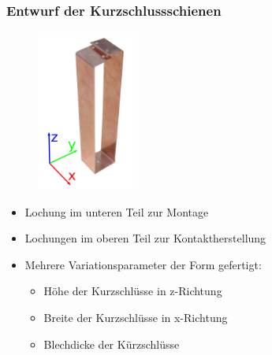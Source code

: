 \documentclass[accentcolor=tud9b, colorbacktitle, inverttitle]{tudbeamer}
\begin{document}
\begin{frame}\frametitle{Entwurf der Kurzschlussschienen}
\vspace{-1em}
\begin{multicols}{2}
	\begin{figure}[h]
		\centering
		\includegraphics[width=0.3\textwidth]{KS}
	\end{figure}
	\vfill\null
	\columnbreak
	\begin{itemize}
		\item Lochung im unteren Teil zur Montage
		\item Lochungen im oberen Teil zur Kontaktherstellung
		\item Mehrere Variationsparameter der Form gefertigt:
		\begin{itemize}
			\item H\"ohe der Kurzschl\"usse in z-Richtung
			\item Breite der Kurzschl\"usse in x-Richtung
			\item Blechdicke der K\"urzschl\"usse
		\end{itemize}
	\end{itemize}
	\vfill\null
\end{multicols}
\end{frame}


\end{document}
